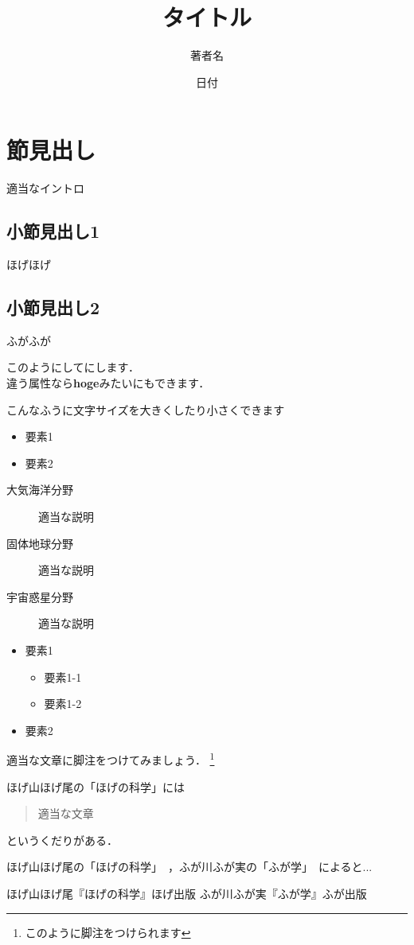 \documentclass[lualatex]{jlreq}
\title{タイトル}
\author{著者名}
\date{日付}
\begin{document}
	\maketitle

	\tableofcontents
	
	\section{節見出し}
	適当なイントロ
	\subsection{小節見出し1}
	ほげほげ
	\subsection{小節見出し2}
	ふがふが

	このようにしてにします．\\
	違う属性なら\textbf{\textsf{hoge}}みたいにもできます．

	こんなふうに文字サイズを{\LARGE 大きく}したり{\footnotesize 小さく}できます

	\begin{itemize}
		\item 要素1
		\item 要素2
	\end{itemize}
	\begin{description}
		\item[大気海洋分野] 適当な説明
		\item[固体地球分野] 適当な説明
		\item[宇宙惑星分野] 適当な説明
	\end{description}
	\newpage
	\begin{itemize}
		\item 要素1
		\begin{itemize}
			\item 要素1-1
			\item 要素1-2
		\end{itemize}
		\item 要素2
	\end{itemize}

	適当な文章に脚注をつけてみましょう．
	\footnote{このように脚注をつけられます}

	ほげ山ほげ尾の「ほげの科学」には
	\begin{quotation}
		適当な文章
	\end{quotation}
	というくだりがある．

	ほげ山ほげ尾の「ほげの科学」~\cite{ほげ}，ふが川ふが実の「ふが学」~\cite{ふが}によると...

	\scsnowman

	\begin{thebibliography}{9}
		 ほげ山ほげ尾『ほげの科学』ほげ出版
		 ふが川ふが実『ふが学』ふが出版
	\end{thebibliography}
\end{document}
